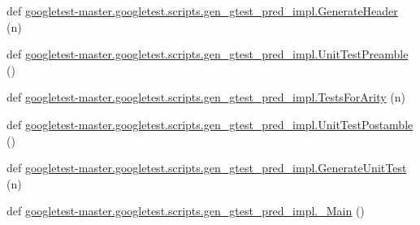 \begin{DoxyCompactItemize}
def \mbox{\hyperlink{namespacegoogletest-master_1_1googletest_1_1scripts_1_1gen__gtest__pred__impl_affc836dabfcc4b3412ddef93a395c416}{googletest-\/master.\+googletest.\+scripts.\+gen\+\_\+gtest\+\_\+pred\+\_\+impl.\+Generate\+Header}} (n)
\item 
def \mbox{\hyperlink{namespacegoogletest-master_1_1googletest_1_1scripts_1_1gen__gtest__pred__impl_a1ca8f84f9c1c030727133efe09b704aa}{googletest-\/master.\+googletest.\+scripts.\+gen\+\_\+gtest\+\_\+pred\+\_\+impl.\+Unit\+Test\+Preamble}} ()
\item 
def \mbox{\hyperlink{namespacegoogletest-master_1_1googletest_1_1scripts_1_1gen__gtest__pred__impl_ada86e9afeb21f0e2fb524e12f6c1b2db}{googletest-\/master.\+googletest.\+scripts.\+gen\+\_\+gtest\+\_\+pred\+\_\+impl.\+Tests\+For\+Arity}} (n)
\item 
def \mbox{\hyperlink{namespacegoogletest-master_1_1googletest_1_1scripts_1_1gen__gtest__pred__impl_af9d59c15effe7759757777b08169d1bc}{googletest-\/master.\+googletest.\+scripts.\+gen\+\_\+gtest\+\_\+pred\+\_\+impl.\+Unit\+Test\+Postamble}} ()
\item 
def \mbox{\hyperlink{namespacegoogletest-master_1_1googletest_1_1scripts_1_1gen__gtest__pred__impl_a6bff3ef3957dc3ce469662f51f08f2d2}{googletest-\/master.\+googletest.\+scripts.\+gen\+\_\+gtest\+\_\+pred\+\_\+impl.\+Generate\+Unit\+Test}} (n)
\item 
def \mbox{\hyperlink{namespacegoogletest-master_1_1googletest_1_1scripts_1_1gen__gtest__pred__impl_aaee30d47547b729195d09fc4eafa7487}{googletest-\/master.\+googletest.\+scripts.\+gen\+\_\+gtest\+\_\+pred\+\_\+impl.\+\_\+\+Main}} ()
\end{DoxyCompactItemize}
